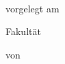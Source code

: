 \thispagestyle{empty}

\begin{spacing}{1}
\begin{center}	
~\vspace{0mm}

{\sffamily
    \LARGE  
    \textbf{\themaMeinerArbeit}
    
    \bigskip
    \textbf{\unterThemaMeinerArbeit}
}

\vspace{15mm}

{\Large \typMeinerArbeit}

\vspace{1cm}

vorgelegt am  \duedate

\vspace{15mm}

Fakultät \faculty
\medskip

\specialisation
\medskip

\course

\vspace{10mm}

von

\vspace{10mm}

{\large\textsc{\meinName}}

\vspace{5mm}
\end{center}

\vfill




\begin{tabular}{l}  %
\end{tabular}


\end{spacing}

